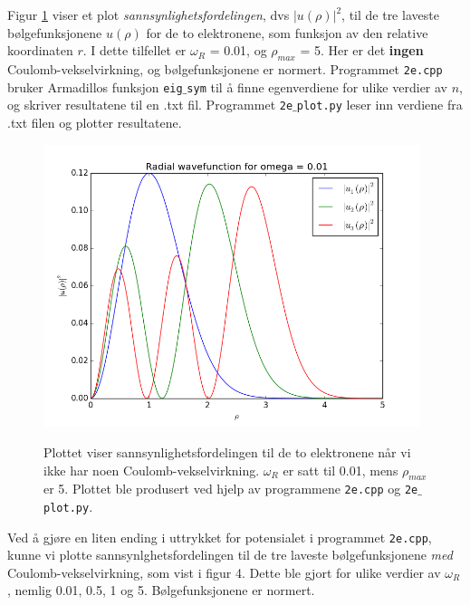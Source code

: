 \documentclass{article}
\begin{document}
Figur \ref{fig:0_01OFF} viser et plot \textit{sannsynlighetsfordelingen}, dvs $|u(\rho)|^2$, til de tre laveste bølgefunksjonene $u(\rho)$ for de to elektronene, som funksjon av den relative koordinaten $r$. I dette tilfellet er $\omega_R$ = 0.01, og $\rho_{max}$ = 5. Her er det \textbf{ingen} Coulomb-vekselvirkning, og bølgefunksjonene er normert. Programmet \texttt{2e.cpp} bruker Armadillos funksjon \texttt{eig$\_$sym} til å finne egenverdiene for ulike verdier av $n$, og skriver resultatene til en .txt fil. Programmet \texttt{2e$\_$plot.py} leser inn verdiene fra .txt filen og plotter resultatene.

\FloatBarrier
\begin{figure}[!ht]
  \begin{center}
  \includegraphics[width = 110mm]{2e_0_01_OFF.png}\\
  \caption{Plottet viser sannsynlighetsfordelingen til de to elektronene når vi ikke har noen Coulomb-vekselvirkning. $\omega_R$ er satt til 0.01, mens $\rho_{max}$ er 5. Plottet ble produsert ved hjelp av programmene \texttt{2e.cpp} og \texttt{2e$\_$plot.py}.}\label{fig:0_01OFF}
  \end{center}
\end{figure}
\FloatBarrier

Ved å gjøre en liten ending i uttrykket for potensialet i programmet \texttt{2e.cpp}, kunne vi plotte sannsynlghetsfordelingen til de tre laveste bølgefunksjonene \textit{med} Coulomb-vekselvirkning, som vist i figur 4. Dette ble gjort for ulike verdier av $\omega_R$, nemlig 0.01, 0.5, 1 og 5. Bølgefunksjonene er normert.
\end{document}
